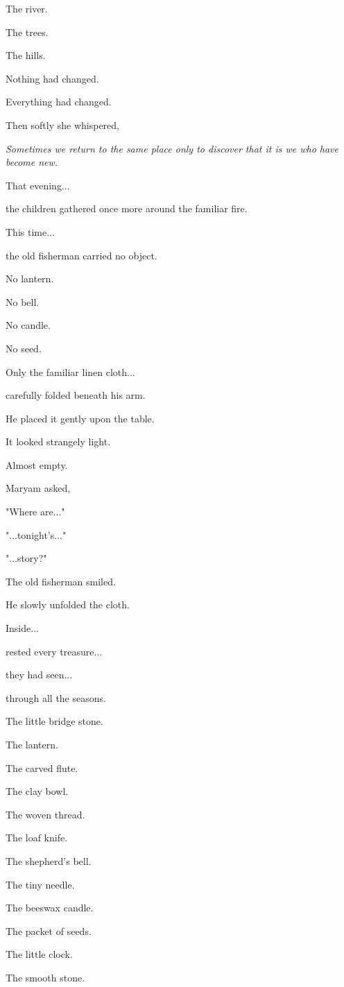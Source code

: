 \documentclass[12pt,openany]{book}
\begin{document}
The river.

The trees.

The hills.

Nothing had changed.

Everything had changed.

Then softly she whispered,

\emph{Sometimes we return to the same place only to discover that it is we who have become new.}

That evening...

the children gathered once more around the familiar fire.

This time...

the old fisherman carried no object.

No lantern.

No bell.

No candle.

No seed.

Only the familiar linen cloth...

carefully folded beneath his arm.

He placed it gently upon the table.

It looked strangely light.

Almost empty.

Maryam asked,

"Where are..."

"...tonight's..."

"...story?"

The old fisherman smiled.

He slowly unfolded the cloth.

Inside...

rested every treasure...

they had seen...

through all the seasons.

The little bridge stone.

The lantern.

The carved flute.

The clay bowl.

The woven thread.

The loaf knife.

The shepherd's bell.

The tiny needle.

The beeswax candle.

The packet of seeds.

The little clock.

The smooth stone.
\end{document}
